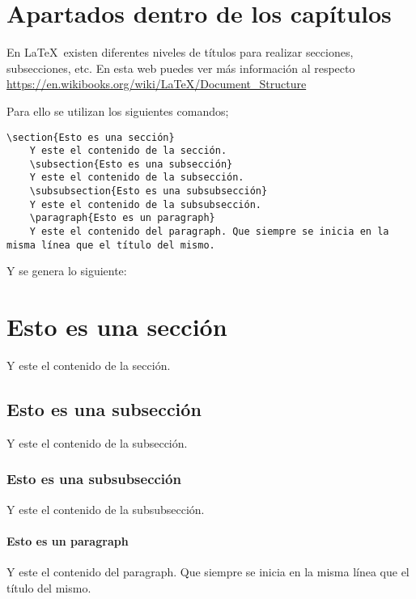 \section{Apartados dentro de los capítulos}
En \LaTeX~existen diferentes niveles de títulos para realizar secciones, subsecciones, etc. En esta web puedes ver más información al respecto \url{https://en.wikibooks.org/wiki/LaTeX/Document_Structure}

Para ello se utilizan los siguientes comandos;

\begin{lstlisting}[style=Latex-color]
	\section{Esto es una sección}
	Y este el contenido de la sección.
	\subsection{Esto es una subsección}
	Y este el contenido de la subsección.
	\subsubsection{Esto es una subsubsección}
	Y este el contenido de la subsubsección.
	\paragraph{Esto es un paragraph}
 	Y este el contenido del paragraph. Que siempre se inicia en la misma línea que el título del mismo.
\end{lstlisting}
 Y se genera lo siguiente:
 \section{Esto es una sección}
	Y este el contenido de la sección.
	\subsection{Esto es una subsección}
	Y este el contenido de la subsección.
	\subsubsection{Esto es una subsubsección}
	Y este el contenido de la subsubsección.
	\paragraph{Esto es un paragraph}
 	Y este el contenido del paragraph. Que siempre se inicia en la misma línea que el título del mismo.

